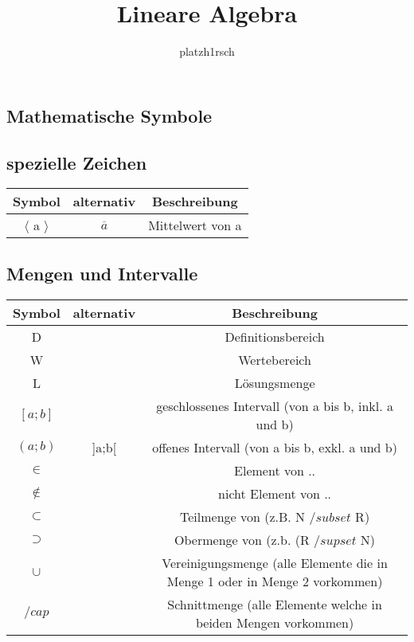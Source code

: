 \documentclass[11pt,a4paper,onecolumn]{article}
\author{platzh1rsch}
\title{Lineare Algebra}
\begin{document}
\maketitle
\newpage
\begin{flushleft}

\section{Mathematische Symbole}
\subsection{spezielle Zeichen}

\begin{tabular}{|c|c|c|}
\hline 
Symbol & alternativ & Beschreibung \\ 
\hline 
$ \langle $ a $ \rangle $ & $ \overline{a} $ & Mittelwert von a \\ 
\hline 
\end{tabular} 

\subsection{Mengen und Intervalle}

\begin{tabular}{|c|c|c|}
\hline 
Symbol & alternativ & Beschreibung \\ 
\hline 
D  &  & Definitionsbereich \\ 
W  &  & Wertebereich \\ 
L  &  & Lösungsmenge \\ 
\hline
$ [a;b] $ &  & geschlossenes Intervall (von a bis b, inkl. a und b)\\ 
$(a;b)$  & ]a;b[ & offenes Intervall (von a bis b, exkl. a und b) \\ 
\hline
$ \in $ &  & Element von .. \\  
$ \notin $ &  & nicht Element von .. \\  
$ \subset $ & & Teilmenge von (z.B. N $ /subset $ R) \\
$ \supset $ & & Obermenge von (z.b. (R $ /supset $ N)\\
$\cup$& & Vereinigungsmenge (alle Elemente die in Menge 1 oder in Menge 2 vorkommen)\\
$ /cap $ & & Schnittmenge (alle Elemente welche in beiden Mengen vorkommen)\\
\hline
\end{tabular}


\end{flushleft}
\end{document}
